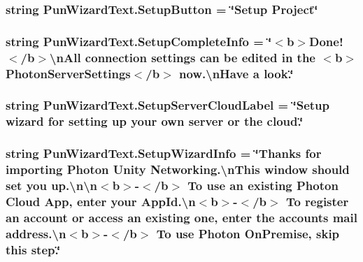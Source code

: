 \subsubsection[{\texorpdfstring{Setup\+Button}{SetupButton}}]{\setlength{\rightskip}{0pt plus 5cm}string Pun\+Wizard\+Text.\+Setup\+Button = \char`\"{}Setup Project\char`\"{}}\hypertarget{class_pun_wizard_text_a8caffc5953e24d8a4895e4842873872d}{}\label{class_pun_wizard_text_a8caffc5953e24d8a4895e4842873872d}
\subsubsection[{\texorpdfstring{Setup\+Complete\+Info}{SetupCompleteInfo}}]{\setlength{\rightskip}{0pt plus 5cm}string Pun\+Wizard\+Text.\+Setup\+Complete\+Info = \char`\"{}$<$b$>$Done!$<$/b$>$\textbackslash{}n\+All connection settings can be edited in the $<$b$>$Photon\+Server\+Settings$<$/b$>$ now.\textbackslash{}n\+Have a look.\char`\"{}}\hypertarget{class_pun_wizard_text_a338b0f8e3a6ef07835774e3a78120d5e}{}\label{class_pun_wizard_text_a338b0f8e3a6ef07835774e3a78120d5e}
\subsubsection[{\texorpdfstring{Setup\+Server\+Cloud\+Label}{SetupServerCloudLabel}}]{\setlength{\rightskip}{0pt plus 5cm}string Pun\+Wizard\+Text.\+Setup\+Server\+Cloud\+Label = \char`\"{}Setup wizard for setting up your own server or the cloud.\char`\"{}}\hypertarget{class_pun_wizard_text_a9241c78a967abc0c2ec06a51d05c43a7}{}\label{class_pun_wizard_text_a9241c78a967abc0c2ec06a51d05c43a7}
\subsubsection[{\texorpdfstring{Setup\+Wizard\+Info}{SetupWizardInfo}}]{\setlength{\rightskip}{0pt plus 5cm}string Pun\+Wizard\+Text.\+Setup\+Wizard\+Info = \char`\"{}Thanks for importing Photon Unity Networking.\textbackslash{}n\+This window should set you up.\textbackslash{}n\textbackslash{}n$<$b$>$-\/$<$/b$>$ To use an existing Photon Cloud App, enter your App\+Id.\textbackslash{}n$<$b$>$-\/$<$/b$>$ To register an account or access an existing one, enter the account\textquotesingle{}s mail address.\textbackslash{}n$<$b$>$-\/$<$/b$>$ To use Photon On\+Premise, skip this step.\char`\"{}}\hypertarget{class_pun_wizard_text_a503b62f5d16e879aeb94d23cfc37a9cb}{}\label{class_pun_wizard_text_a503b62f5d16e879aeb94d23cfc37a9cb}
